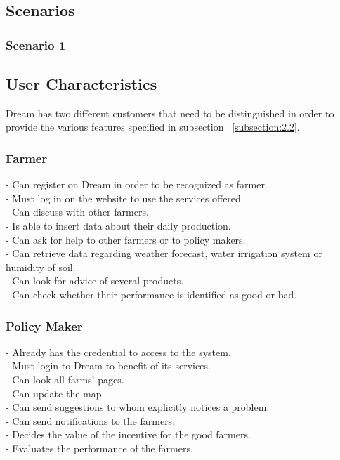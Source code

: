 \documentclass{article}
\begin{document}
\subsection{Scenarios}
\subsubsection{Scenario 1}


\subsection{User Characteristics}
Dream has two different customers that need to be 
distinguished in order to provide the various 
features specified in subsection ~\ref{subsection:2.2}.
\subsubsection{Farmer}
- Can register on Dream in order to be recognized as farmer.\\
- Must log in on the website to use the services offered.\\
- Can discuss with other farmers.\\
- Is able to insert data about their daily production. \\
- Can ask for help to other farmers or to policy makers.\\
- Can retrieve data regarding weather forecast, water irrigation system or humidity of soil.\\
- Can look for advice of several products.\\
- Can check whether their performance is identified as good or bad.
\subsubsection{Policy Maker}
- Already has the credential to access to the system.\\
- Must login to Dream to benefit of its services.\\
- Can look all farms' pages.\\
- Can update the map.\\
- Can send suggestions to whom explicitly notices a problem.\\
- Can send notifications to the farmers.\\
- Decides the value of the incentive for the good farmers.\\
- Evaluates the performance of the farmers.\\
\end{document}
